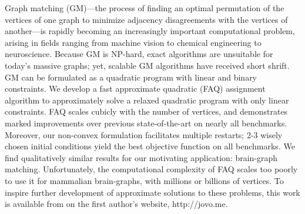 Graph matching (GM)---the process of finding an optimal permutation of the vertices of one graph to minimize adjacency disagreements with the vertices of another---is rapidly becoming an increasingly important computational problem, arising in fields ranging from machine vision to chemical engineering to neuroscience. Because GM is NP-hard, exact algorithms are unsuitable for today's massive graphs; yet, scalable GM algorithms have received short shrift.  GM can be formulated as a quadratic program with linear and binary constraints.  We develop a fast approximate quadratic (FAQ) assignment algorithm to approximately solve a relaxed quadratic program with only linear constraints.  FAQ scales cubicly with the number of vertices, and demonstrates marked improvements over previous state-of-the-art on nearly all benchmarks. Moreover, our non-convex formulation facilitates multiple restarts; 2-3 wisely chosen initial conditions yield the best objective function on all benchmarks. We find qualitatively similar results for our motivating application: brain-graph matching.  Unfortunately, the computational complexity of FAQ scales too poorly to use it for mammalian brain-graphs, with millions or billions of vertices.  To inspire further development of approximate solutions to these problems, this work is available from on the first author's website, http://jovo.me.